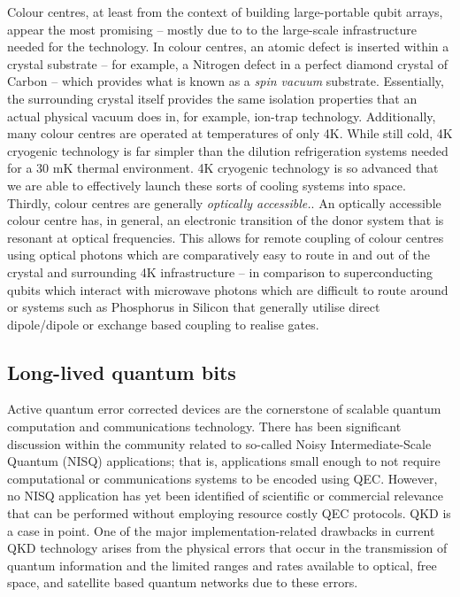 \documentclass[twocolumn, aps, rmp, amsmath, amssymb, nofootinbib, superscriptaddress, longbibliography, floatfix, table-of-contents, eqsecnum]{revtex4-2}
\begin{document}
Colour centres, at least from the context of building large-portable qubit arrays, appear the most promising -- mostly due to to the large-scale infrastructure needed for the technology. In colour centres, an atomic defect is inserted within a crystal substrate -- for example, a Nitrogen defect in a perfect diamond crystal of Carbon -- which provides what is known as a \textit{spin vacuum} substrate. Essentially, the surrounding crystal itself provides the same isolation properties that an actual physical vacuum does in, for example, ion-trap technology. Additionally, many colour centres are operated at temperatures of only 4K. While still cold, 4K cryogenic technology is far simpler than the dilution refrigeration systems needed for a 30 mK thermal environment. 4K cryogenic technology is so advanced that we are able to effectively launch these sorts of cooling systems into space. Thirdly, colour centres are generally \textit{optically accessible.}. An optically accessible colour centre has, in general, an electronic transition of the donor system that is resonant at optical frequencies. This allows for remote coupling of colour centres using optical photons which are comparatively easy to route in and out of the crystal and surrounding 4K infrastructure -- in comparison to superconducting qubits which interact with microwave photons which are difficult to route around or systems such as Phosphorus in Silicon that generally utilise direct dipole/dipole or exchange based coupling to realise gates. 

\subsection{Long-lived quantum bits}

Active quantum error corrected devices are the cornerstone of scalable quantum computation and communications technology. There has been significant discussion within the community related to so-called Noisy Intermediate-Scale Quantum (NISQ) applications; that is, applications small enough to not require computational or communications systems to be encoded using QEC. However, no NISQ application has yet been identified of scientific or commercial relevance that can be performed without employing resource costly QEC protocols. QKD is a case in point. One of the major implementation-related drawbacks in current QKD technology arises from the physical errors that occur in the transmission of quantum information and the limited ranges and rates available to optical, free space, and satellite based quantum networks due to these errors. 
\end{document}
